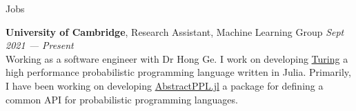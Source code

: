 \begin{rSection}{Jobs}

    {\bf University of Cambridge}, Research Assistant, Machine Learning Group  \hfill {\em Sept 2021 — Present} \\
    Working as a software engineer with Dr Hong Ge. I work on developing \href{https://github.com/TuringLang}{Turing}
    a high performance probabilistic programming language written in Julia. 
    Primarily, I have been working on developing \href{https://github.com/TuringLang/AbstractPPL.jl}{AbstractPPL.jl} a package for 
    defining a common API for probabilistic programming languages.
\end{rSection}
    